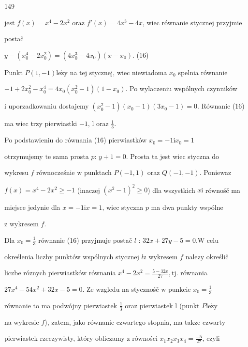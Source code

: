 \documentclass[a4paper,12pt]{article}
\begin{document}
149

jest $f(x)=x^{4}-2x^{2}$ oraz $f'(x)=4x^{3}-4x$, wiec równanie stycznej przyjmie

postač

$y-(x_{0}^{4}-2x_{0}^{2})=(4x_{0}^{3}-4x_{0})(x-x_{0})$.   (16)

Punkt $P(1,-1)\mathrm{l}\mathrm{e}\dot{\mathrm{z}}\mathrm{y}$ na tej stycznej, wiec niewiadoma $x_{0}$ spelnia równanie

$-1+2x_{0}^{2}-x_{0}^{4}=4x_{0}(x_{0}^{2}-1)(1-x_{0})$. Po wylaczeniu wspólnych czynników

$\mathrm{i}$ uporzadkowaniu dostajemy $(x_{0}^{2}-1)(x_{0}-1)(3x_{0}-1)=0$. Równanie (16)

ma wiec trzy pierwiastki $-1$, l oraz $\displaystyle \frac{1}{3}.$

Po podstawieniu do równania (16) pierwiastków $x_{0} = -1 \mathrm{i} x_{0} = 1$

otrzymujemy $\mathrm{t}\mathrm{e}$ sama prosta $p$: $y+1=0$. Prosta ta jest wiec styczna do

wykresu $f$ równocześnie $\mathrm{w}$ punktach $P(-1,1)$ oraz $Q(-1,-1)$. Poniewaz

$f(x)=x^{4}-2x^{2}\geq-1$ (inaczej $(x^{2}-1)^{2}\geq 0$) dla wszystkich $x\mathrm{i}$ równośč ma

miejsce jedynie dla $x=-1\mathrm{i}x=1$, wiec styczna $p$ ma dwa punkty wspólne

$\mathrm{z}$ wykresem $f.$

Dla $x_{0}=\displaystyle \frac{1}{3}$ równanie (16) przyjmuje postač $l$ : $32x+27y-5=0. \mathrm{W}$ celu

określenia liczby punktów wspólnych stycznej $l\mathrm{z}$ wykresem $f$ nalezy określič

liczbe róznych pierwiastków równania $x^{4}-2x^{2} = \displaystyle \frac{5-32x}{27}, \mathrm{t}\mathrm{j}$. równania

$27x^{4}-54x^{2}+32x-5 = 0$. Ze wzgledu na stycznośč $\mathrm{w}$ punkcie $x_{0} = \displaystyle \frac{1}{3}$

równanie to ma podwójny pierwiastek $\displaystyle \frac{1}{3}$ oraz pierwiastek l (punkt $P\mathrm{l}\mathrm{e}\dot{\mathrm{z}}\mathrm{y}$

na wykresie $f$), zatem, jako równanie czwartego stopnia, ma takze czwarty

pierwiastek rzeczywisty, który obliczamy $\mathrm{z}$ równości $x_{1}x_{2}x_{3}x_{4}=\displaystyle \frac{-5}{27}$, czyli
\end{document}
